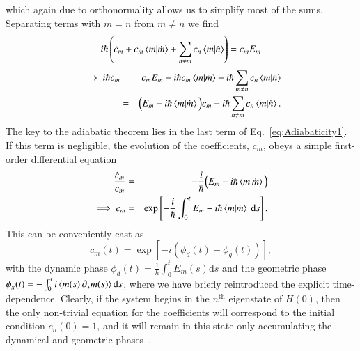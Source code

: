 which again due to orthonormality allows us to simplify most of the sums. Separating terms with $m=n$ from $m\neq n$ we find
\begin{equation}
i\hbar \left(\dot{c}_m + c_m \braket{m}{\dot{m}} + \sum_{n\neq m} c_n \braket{m}{\dot{n}} \right) = c_m E_m
\end{equation}
\begin{eqnarray}
\implies i\hbar \dot{c}_m &=& c_m E_m - i \hbar c_m \braket{m}{\dot{m}} - i\hbar \sum_{m\neq n} c_n \braket{m}{\dot{n}} \nonumber \\
&=& \Big(E_m -i\hbar \braket{m}{\dot{m}} \Big)c_m - i\hbar \sum_{n\neq m}c_n \braket{m}{\dot{n}}. \label{eq:Adiabaticity1}
\end{eqnarray}
The key to the adiabatic theorem lies in the last term of Eq.~\eqref{eq:Adiabaticity1}. If this term is negligible, the evolution of the coefficients, $c_m$, obeys a simple first-order differential equation
\begin{eqnarray}
\frac{\dot{c}_m}{c_m} &=& - \frac{i}{\hbar} \Big( E_m - i\hbar \braket{m}{\dot{m}} \Big) \nonumber \\
 \implies c_m &=& \exp\left[ - \frac{i}{\hbar} \int_0^t E_m - i\hbar \braket{m}{\dot{m}}~\mathrm ds  \right].
\end{eqnarray} 
This can be conveniently cast as 
\begin{equation}
c_m(t)=\exp[-i (\phi_d(t) + \phi_g(t))],
\end{equation}
with the dynamic phase $\phi_d(t)=\frac{1}{\hbar} \int_0^t E_m(s)\mathrm d s$ and the geometric phase $\phi_g(t) = -\int_0^t i \braket{m(s)}{\partial_s{m(s)}}\mathrm ds$, where we have briefly reintroduced the explicit time-dependence.
Clearly, if the system begins in the $n^\text{th}$ eigenstate of $H(0)$, then the only non-trivial equation for the coefficients will correspond to the initial condition $c_n(0)=1$, and it will remain in this state only accumulating the dynamical and geometric phases~\cite{Berry1984}.

